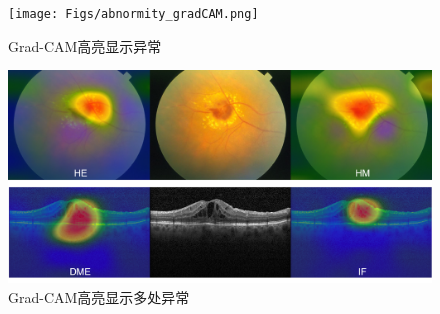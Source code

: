 \documentclass{article}
\begin{document}
		\begin{figure}[htbp]
			\centering
			\texttt{[image: Figs/abnormity\_gradCAM.png]}
			\caption{Grad-CAM高亮显示异常}
			\vspace{0.3cm}
			\label{fig:gradCAM}
		\end{figure}
		
		\begin{figure}[htbp]
			\centering
			\includegraphics[width=0.8\linewidth]{Figs/abnormity_gradCAM_multiple_abnormities.png}
			\caption{Grad-CAM高亮显示多处异常}
			\vspace{0.3cm}
			\label{fig:gradCAM_multi_abnormity}
		\end{figure}
	
		\vspace{1.5cm}
	
	
		
	\pagebreak	
	
\end{document}
